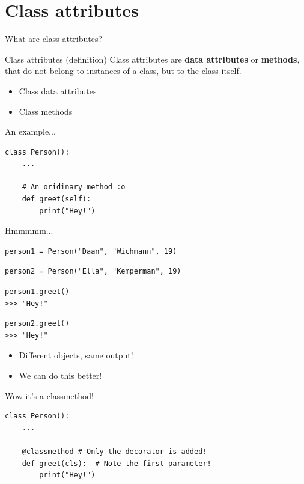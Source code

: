\section{Class attributes}

\begin{frame}{What are class attributes?}
\pause
\begin{block}{Class attributes (definition)}
    Class attributes are \textbf{data attributes} or \textbf{methods}, that do not belong to instances of a class, but to the class itself.
\end{block}
\pause
\begin{itemize}
    \item Class data attributes
    \pause
    \item Class methods
\end{itemize}
\end{frame}

\begin{frame}[fragile]{An example...}
\pause
\begin{verbatim}
class Person():
    ...

    # An oridinary method :o
    def greet(self):
        print("Hey!")
\end{verbatim}
\end{frame}

\begin{frame}[fragile]{Hmmmmm...}
\pause
\begin{verbatim}
person1 = Person("Daan", "Wichmann", 19)
\end{verbatim}
\pause
\begin{verbatim}
person2 = Person("Ella", "Kemperman", 19)
\end{verbatim}
\pause
\begin{verbatim}
person1.greet()
>>> "Hey!"
\end{verbatim}
\pause
\begin{verbatim}
person2.greet()
>>> "Hey!"
\end{verbatim}
\pause
\begin{itemize}
    \item Different objects, same output!
    \pause
    \item We can do this better!
\end{itemize}
\end{frame}

\begin{frame}[fragile]{Wow it's a classmethod!}
\pause
\begin{verbatim}
class Person():
    ...

    @classmethod # Only the decorator is added!
    def greet(cls):  # Note the first parameter!
        print("Hey!")
\end{verbatim}
\end{frame}

